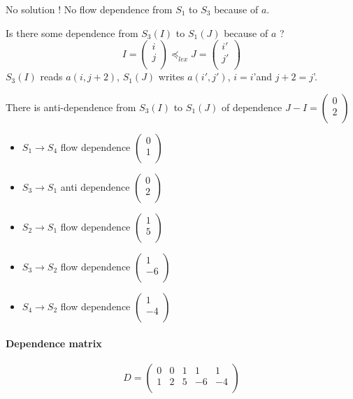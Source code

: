 \documentclass{article}
\begin{document}
No solution ! No flow dependence from $S_1$ to $S_3$ because of $a$.

Is there some dependence from $S_3(I)$ to $S_1(J)$ because of $a$ ?
\[I=\begin{pmatrix}
i\\j\\
\end{pmatrix} \preceq_{lex} J=\begin{pmatrix}
i'\\j'\\
\end{pmatrix}\]
$S_3(I)$ reads $a(i,j+2)$, $S_1(J)$ writes $a(i',j')$, $i=i$'and $j+2=j$'.

There is anti-dependence from $S_3(I)$ to $S_1(J)$ of dependence $J-I=\begin{pmatrix}
0\\2\\
\end{pmatrix}$

\begin{itemize}
\item $S_1\to S_4$ flow dependence $\begin{pmatrix}
0\\1\\
\end{pmatrix}$
\item $S_3\to S_1$ anti dependence $\begin{pmatrix}
0\\2\\
\end{pmatrix}$
\item $S_2\to S_1$ flow dependence $\begin{pmatrix}
1\\5\\
\end{pmatrix}$
\item $S_3\to S_2$ flow dependence $\begin{pmatrix}
1\\-6\\
\end{pmatrix}$
\item $S_4\to S_2$ flow dependence $\begin{pmatrix}
1\\-4\\
\end{pmatrix}$
\end{itemize}

\paragraph{Dependence matrix}
\[D=
\begin{pmatrix}
0&0&1&1&1\\
1&2&5&-6&-4\\
\end{pmatrix}
\]
\end{document}
